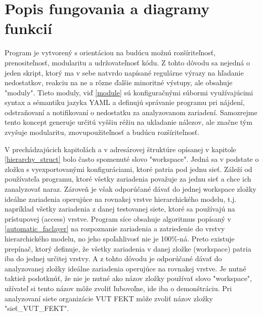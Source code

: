 \section{Popis fungovania a diagramy funkcií}
Program je vytvorený s orientáciou na budúcu možnú rozšíriteľnosť, prenositeľnosť, modularitu a udržovateľnosť kódu. Z tohto dôvodu sa nejedná o jeden skript, ktorý ma v sebe natvrdo napísané regulárne výrazy na hľadanie nedostatkov, reakciu na ne a rôzne ďalšie minoritné výstupy, ale obsahuje "moduly". Tieto moduly, viď \ref{module} sú konfiguračnými súbormi využívajúcimi syntax a sémantiku jazyka YAML a definujú správanie programu pri nájdení, odstraňovaní a notifikovaní o nedostatku za analyzovanom zariadení. Samozrejme tento koncept generuje určitú vyššiu réžiu na ukladanie nálezov, ale značne tým zvyšuje modularitu, znovupoužiteľnosť a budúcu rozšíriteľnosť.

V prechádzajúcich kapitolách a v adresárovej štruktúre opísanej v kapitole \ref{hierarchy_struct} bolo často spomenuté slovo "workspace". Jedná sa v podstate o zložku s vyexportovanými konfiguráciami, ktoré patria pod jednu sieť. Záleží od používateľa programu, ktoré všetky zariadenia považuje za jednu sieť a chce ich zanalyzovať naraz. Zároveň je však odporúčané dávať do jednej workspace zložky ideálne zariadenia operujúce na rovnakej vrstve hierarchického modelu, t.j. napríklad všetky zariadenia z danej testovanej siete, ktoré sa používajú na prístupovej (access) vrstve. Program síce obsahuje algoritmus popísaný v \ref{automatic_faclayer} na rozpoznanie zariadenia a zatriedenie do vrstvy hierarchického modelu, no jeho spoľahlivosť nie je 100\%-ná. Preto existuje prepínač, ktorý definuje, že všetky zariadenia v danej zložke (workspace) patria iba do jednej určitej vrstvy. A z tohto dôvodu je odporúčané dávať do analyzovanej zložky ideálne zariadenia operujúce na rovnakej vrstve. Je nutné taktiež podotknúť, že nie je nutné ako názov zložky používať slovo "workspace", užívateľ si tento názov môže zvoliť ľubovoľne, ide iba o demonštráciu. Pri analyzovaní siete organizácie VUT FEKT môže zvoliť názov zložky "sieť\_VUT\_FEKT".

